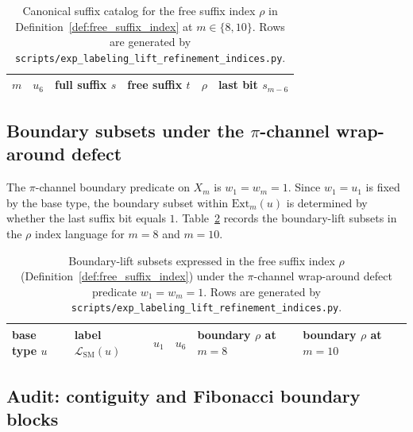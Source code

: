 \begin{table}[H]
\centering
\scriptsize
\setlength{\tabcolsep}{6pt}
\renewcommand{\arraystretch}{1.15}
\begin{tabular}{rrllrr}
\toprule
$m$ & $u_6$ & full suffix $s$ & free suffix $t$ & $\rho$ & last bit $s_{m-6}$ \\
\midrule
%
\end{tabular}
\caption{Canonical suffix catalog for the free suffix index $\rho$ in Definition~\ref{def:free_suffix_index} at $m\in\{8,10\}$. Rows are generated by \texttt{scripts/exp\_labeling\_lift\_refinement\_indices.py}.}
\label{tab:label_lift_suffix_catalog}
\end{table}

\subsection{Boundary subsets under the \texorpdfstring{$\pi$}{pi}-channel wrap-around defect}
\label{subsec:lift_boundary_subsets}

The $\pi$-channel boundary predicate on $X_m$ is $w_1=w_m=1$.
Since $w_1=u_1$ is fixed by the base type, the boundary subset within $\mathrm{Ext}_m(u)$ is determined by whether the last suffix bit equals $1$.
Table~\ref{tab:label_lift_boundary_rho} records the boundary-lift subsets in the $\rho$ index language for $m=8$ and $m=10$.

\begin{table}[H]
\centering
\scriptsize
\setlength{\tabcolsep}{6pt}
\renewcommand{\arraystretch}{1.15}
\begin{tabular}{llrrll}
\toprule
base type $u$ & label $\mathcal{L}_{\mathrm{SM}}(u)$ & $u_1$ & $u_6$ & boundary $\rho$ at $m=8$ & boundary $\rho$ at $m=10$ \\
\midrule
%
\end{tabular}
\caption{Boundary-lift subsets expressed in the free suffix index $\rho$ (Definition~\ref{def:free_suffix_index}) under the $\pi$-channel wrap-around defect predicate $w_1=w_m=1$. Rows are generated by \texttt{scripts/exp\_labeling\_lift\_refinement\_indices.py}.}
\label{tab:label_lift_boundary_rho}
\end{table}

\subsection{Audit: contiguity and Fibonacci boundary blocks}
\label{subsec:lift_refinement_audit}

